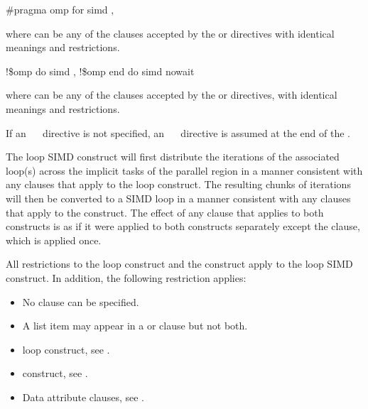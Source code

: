 \pagebreak
\begin{samepage}
\syntax
\ccppspecificstart
\begin{boxedcode}
\#pragma omp for simd \plc{[clause[ [},\plc{] clause] ... ] new-line}
\end{boxedcode}
\end{samepage}

where  can be any of the clauses accepted by the  or  directives with 
identical meanings and restrictions.
\ccppspecificend

\fortranspecificstart
\begin{boxedcode}
!\$omp do simd \plc{[clause[ [},\plc{] clause] ... ]}
\plc{[}!\$omp end do simd \plc{[}nowait\plc{] ]}
\end{boxedcode}

where  can be any of the clauses accepted by the  or  directives, with 
identical meanings and restrictions.

If an ~~ directive is not specified, an ~~ directive is 
assumed at the end of the .
\fortranspecificend

\descr
The loop SIMD construct will first distribute the iterations of the associated loop(s) 
across the implicit tasks of the parallel region in a manner consistent with any clauses 
that apply to the loop construct. The resulting chunks of iterations will then be converted 
to a SIMD loop in a manner consistent with any clauses that apply to the  
construct. The effect of any clause that applies to both constructs is as if it were applied to both constructs separately except the  clause, which is applied once.

\restrictions
All restrictions to the loop construct and the  construct apply to the loop SIMD 
construct. In addition, the following restriction applies:

\begin{itemize}
\item No  clause can be specified.
\item A list item may appear in a  or  clause but not both.
\end{itemize}

\begin{samepage}
\crossreferences
\begin{itemize}
\item loop construct, see 
.

\item {} construct, see 
.

\item Data attribute clauses, see 
. 
\end{itemize}
\end{samepage}




